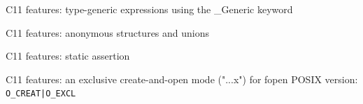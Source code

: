 \begin{frame}{C11 features: type-generic expressions using the \_Generic keyword}
    
\end{frame}
\begin{frame}{C11 features: anonymous structures and unions}
    
\end{frame}
\begin{frame}{C11 features: static assertion}
\end{frame}
\begin{frame}{C11 features: an exclusive create-and-open mode ("...x") for fopen}
    POSIX version: \texttt{O\_CREAT|O\_EXCL}
    
\end{frame}
